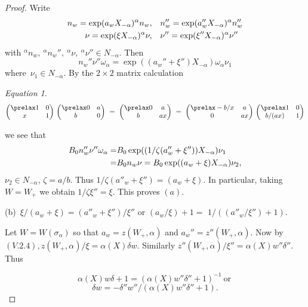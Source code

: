 \documentclass{memo-l}
\theoremstyle{definition}
\theoremstyle{remark}
\newtheorem{eqn}[theorem]{Equation}
\numberwithin{section}{chapter}
\numberwithin{equation}{chapter}
\begin{document}
\begin{proof}  Write 
$$
\aligned
n_{w} = \exp(a_{w}X_{-{\alpha}})^{{\alpha}}n_{w}, \quad & 
n_{w}'' = \exp(a_{w}''X_{-{\alpha}})^{{\alpha}}n_{w}'' \\
{\nu} = \exp({\xi}X_{-{\alpha}})^{{\alpha}}{\nu}, \quad &
{\nu}'' = \exp({\xi}''X_{-{\alpha}})^{{\alpha}}{\nu}''
\endaligned
$$
with ${}^{{\alpha}}n_{w},\ {}^{{\alpha}}n_{w}'',\ {}^{{\alpha}}{\nu},\
{}^{{\alpha}}{\nu}''  \in  N_{-{\alpha}}$.  Then 
$$
n_{w}''{\nu}''{\omega}_{{\alpha}} = 
\exp((a_{w}''+{\xi}'')X_{-{\alpha}}){\omega}_{{\alpha}}{\nu}_{1}
$$ 
where\ ${\nu}_{1}  \in  N_{-{\alpha}}$.  By the $2\times 2$ matrix calculation

\medpagebreak

\begin{eqn} %
$$
{\begin{pmatrix} \prelax  1 & 0 \\ x & 1 \end{pmatrix}}\
{\begin{pmatrix} \prelax  0 & a \\ b & 0 \end{pmatrix}}\ =\
{\begin{pmatrix} \prelax  
 0 & a \\ b & ax \end{pmatrix}}\ =\
{\begin{pmatrix} \prelax  
 -b/x & a \\ 0 & ax \end{pmatrix}}\
{\begin{pmatrix} \prelax  
 1 & 0 \\ b/(ax) & 1 \end{pmatrix}}
$$
\end{eqn}
we see that $$\aligned 
B_{0}n''_{w}{\nu''}{\omega}_{{\alpha}} =&
B_{0}\exp((1/{\zeta}(a''_{w}+{\xi''}))X_{-{\alpha}}){\nu}_{1}\\
=& B_{0}n_{w}{\nu}
=  B_{0}\exp((a_{w}+{\xi})X_{-{\alpha}}){\nu}_{2},\endaligned$$ 
${\nu}_{2}  \in 
N_{-{\alpha}}$, ${\zeta} = a/b$.  Thus $1/{\zeta}(a''_{w}+{\xi''}) =
(a_{w}+{\xi})$.  In particular, taking $W = W_{+}$ we obtain $1/{\zeta}{\xi''}
= {\xi}$.  This proves $(a)$.

   (b)\  ${\xi}/(a_{w}+{\xi}) = (a''_{w}+{\xi''})/{\xi''}$ or $(a_{w}/{\xi}) + 1 =$
$1/((a''_{w}/{\xi''}) + 1).$

Let $W = W({\sigma}_{{\alpha}})$ so that $a_{w} = z(W_{+},{\alpha})$ and
$a_{w}'' = z''(W_{+},{\alpha})$.  Now by $(V.2.4), z(W_{+},{\alpha})/{\xi} =
{\alpha}(X){\delta}w$.  Similarly $z''(W_{+},{\alpha})/{\xi}'' =
{\alpha}(X)w''{\delta}''$.  Thus

$$
{\alpha}(X)w{\delta} + 1 = ({\alpha}(X)w''{\delta}'' + 1)^{-1}\  {\text{or}}\
$$
$$
{\delta}w = -{\delta}''w''/({\alpha}(X)w''{\delta}'' + 1) .
$$
\end{proof} 
\end{document}
